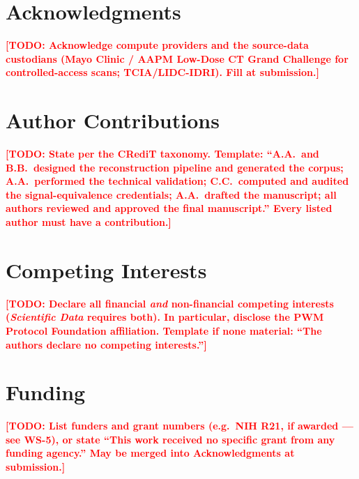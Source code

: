 \documentclass{article}
\newcommand{\todo}[1]{\textcolor{red}{\textbf{[TODO: #1]}}}
\begin{document}
\section*{Acknowledgments}
\todo{Acknowledge compute providers and the source-data custodians (Mayo Clinic
/ AAPM Low-Dose CT Grand Challenge for controlled-access scans; TCIA/LIDC-IDRI).
Fill at submission.}

\section*{Author Contributions}
\todo{State per the CRediT taxonomy. Template: ``A.A.\ and B.B.\ designed the
reconstruction pipeline and generated the corpus; A.A.\ performed the technical
validation; C.C.\ computed and audited the signal-equivalence credentials; A.A.\
drafted the manuscript; all authors reviewed and approved the final
manuscript.'' Every listed author must have a contribution.}

\section*{Competing Interests}
\todo{Declare all financial \emph{and} non-financial competing interests
(\emph{Scientific Data} requires both). In particular, disclose the PWM Protocol
Foundation affiliation. Template if none material: ``The authors declare
no competing interests.''}

\section*{Funding}
\todo{List funders and grant numbers (e.g.\ NIH R21, if awarded --- see WS-5), or
state ``This work received no specific grant from any funding agency.'' May be
merged into Acknowledgments at submission.}



\end{document}
